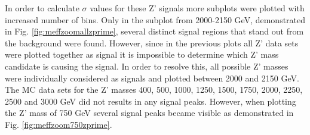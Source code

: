 \documentclass[runningheads,a4paper]{llncs}
\begin{document}
In order to calculate $\sigma$ values for these Z' signals more subplots were plotted with increased number of bins. Only in the subplot from 2000-2150 GeV, demonstrated in Fig. \ref{fig:meffzoomallzprime}, several distinct signal regions that stand out from the background were found. However, since in the previous plots all Z' data sets were plotted together as signal it is impossible to determine which Z' mass candidate is causing the signal. In order to resolve this, all possible Z' masses were individually considered as signals and plotted between 2000 and 2150 GeV. The MC data sets for the Z' masses 400, 500, 1000, 1250, 1500, 1750, 2000, 2250, 2500 and 3000 GeV did not results in any signal peaks. However, when plotting the Z' mass of 750 GeV several signal peaks became visible as demonstrated in Fig. \ref{fig:meffzoom750zprime}.\\
\end{document}
